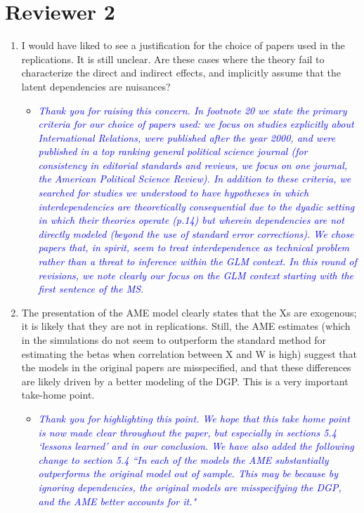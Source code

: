 \section*{Reviewer 2}

\begin{enumerate}
	\item I would have liked to see a justification for the choice of papers used in the replications. It is still unclear. Are these cases where the theory fail to characterize the direct and indirect effects, and implicitly assume that the latent dependencies are nuisances?
	\begin{itemize}
		\item \textcolor{blue}{ \emph{
		Thank you for raising this concern. In footnote 20 we state the primary criteria for our choice of papers used: we focus on studies explicitly about International Relations, were published after the year 2000, and were published in a top ranking general political science journal (for consistency in editorial standards and reviews, we focus on one journal, the American Political Science Review). In addition to these criteria, we searched for studies we understood to have hypotheses in which interdependencies are theoretically consequential due to the dyadic setting in which their theories operate (p.14) but wherein dependencies are not directly modeled (beyond the use of standard error corrections). We chose papers that, in spirit, seem to treat interdependence as technical problem rather than a threat to inference within the GLM context. In this round of revisions, we note clearly our focus on the GLM context starting with the first sentence of the MS.}}
	\end{itemize}
	\item The presentation of the AME model clearly states that the Xs are exogenous; it is likely that they are not in replications. Still, the AME estimates (which in the simulations do not seem to outperform the standard method for estimating the betas when correlation between X and W is high) suggest that the models in the original papers are misspecified, and that these differences are likely driven by a better modeling of the DGP. This is a very important take-home point.
	\begin{itemize}
		\item \textcolor{blue}{ \emph{
			Thank you for highlighting this point. We hope that this take home point is now made clear throughout the paper, but especially in sections 5.4 `lessons learned' and in our conclusion. We have also added the following change to section 5.4 ``In each of the models the AME substantially outperforms the original model out of sample. This may be because by ignoring dependencies, the original models are misspecifying the DGP, and the AME better accounts for it."
			}}
	\end{itemize}
\end{enumerate}
